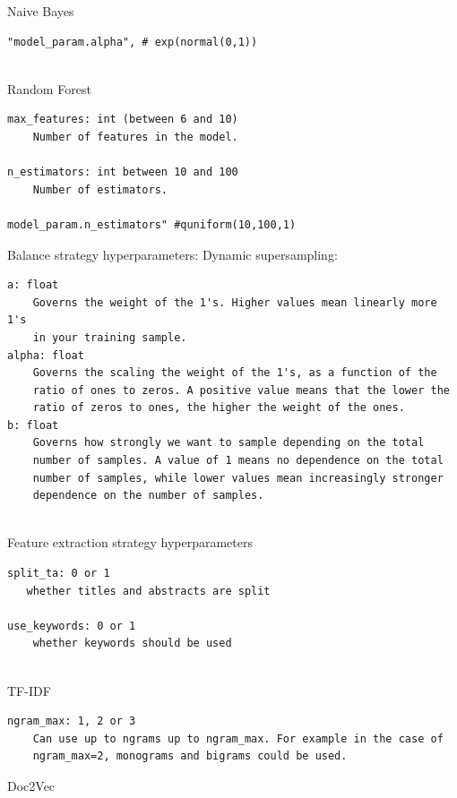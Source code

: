 \documentclass[
]{article}
\begin{document}
Naive Bayes

\begin{verbatim}
"model_param.alpha", # exp(normal(0,1))
         
\end{verbatim}

Random Forest

\begin{verbatim}
max_features: int (between 6 and 10)
    Number of features in the model.

n_estimators: int between 10 and 100 
    Number of estimators.

model_param.n_estimators" #quniform(10,100,1)
\end{verbatim}

Balance strategy hyperparameters: Dynamic supersampling:

\begin{verbatim}
a: float
    Governs the weight of the 1's. Higher values mean linearly more 1's
    in your training sample.
alpha: float
    Governs the scaling the weight of the 1's, as a function of the
    ratio of ones to zeros. A positive value means that the lower the
    ratio of zeros to ones, the higher the weight of the ones.
b: float
    Governs how strongly we want to sample depending on the total
    number of samples. A value of 1 means no dependence on the total
    number of samples, while lower values mean increasingly stronger
    dependence on the number of samples.
    
\end{verbatim}

Feature extraction strategy hyperparameters

\begin{verbatim}
split_ta: 0 or 1
   whether titles and abstracts are split 
   
use_keywords: 0 or 1
    whether keywords should be used
   
\end{verbatim}

TF-IDF

\begin{verbatim}
ngram_max: 1, 2 or 3
    Can use up to ngrams up to ngram_max. For example in the case of 
    ngram_max=2, monograms and bigrams could be used.
\end{verbatim}

Doc2Vec
\end{document}
